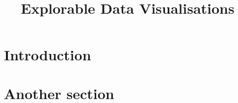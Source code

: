 \documentclass{vgtc}
\title{Explorable Data Visualisations}
\begin{document}
\maketitle

\section{Introduction}

\cite{perera16d,ricciotti17}

\section{Another section}

\acknowledgments{}


\end{document}
